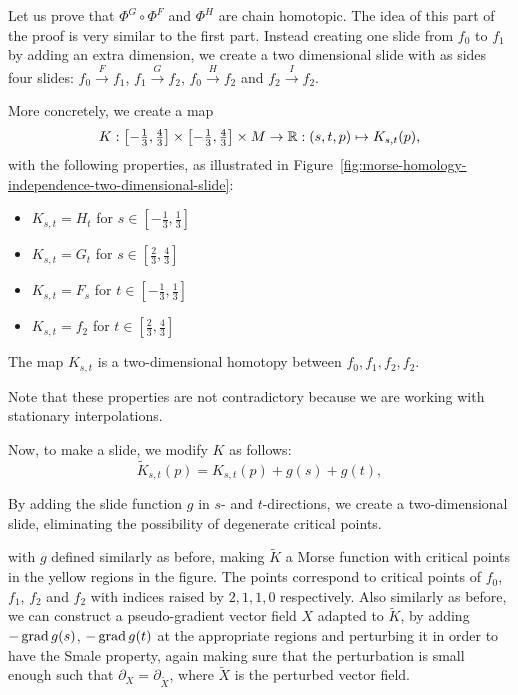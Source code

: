 \begin{myproof}
Let us prove that $\Phi^{G}  \circ  \Phi^{F}$ and $\Phi^{H}$ are chain homotopic.
The idea of this part of the proof is very similar to the first part.
Instead creating one slide from $f_0$ to $f_1$ by adding an extra dimension, we create a two dimensional slide with as sides four slides: $f_0 \xrightarrow{F} f_1$, $ f_1 \xrightarrow{G} f_2$, $f_0 \xrightarrow{H}  f_2$ and $ f_2 \xrightarrow{I} f_2$.


More concretely, we create a map
\[
    K: \left[-\tfrac{1}{3}, \tfrac{4}{3}\right] \times \left[-\tfrac{1}{3}, \tfrac{4}{3}\right] \times M \to  \mathbb{R}:  (s, t, p) \mapsto K_{s, t}(p)
,\] 
with the following properties, as illustrated in Figure~\ref{fig:morse-homology-independence-two-dimensional-slide}:
\begin{itemize}
    \item $K_{s,t} = H_t$ for  $s \in \left[-\tfrac{1}{3}, \tfrac{1}{3}\right]$
    \item $K_{s,t} = G_t$ for  $s \in \left[\tfrac{2}{3}, \tfrac{4}{3}\right]$
        \item $K_{s, t} = F_s$ for $t \in \left[-\tfrac{1}{3}, \tfrac{1}{3}\right]$ 
        \item $K_{s,t} = f_2$ for $t \in \left[\tfrac{2}{3}, \tfrac{4}{3}\right]$
\end{itemize}
\begin{marginfigure}
    \centering
    \caption{The map $K_{s,t}$ is a two-dimensional homotopy between $f_0, f_1, f_2, f_2$.}
    \label{fig:morse-homology-independence-two-dimensional-slide}
\end{marginfigure}
Note that these properties are not contradictory because we are working with stationary interpolations.

Now, to make a slide, we modify $K$ as follows:
 \[
     \tilde{K}_{s,t}(p) = K_{s,t}(p) + g(s) + g(t)
,\] 

\begin{marginfigure}
    \centering
    \caption{By adding the slide function $g$ in $s$- and $t$-directions, we create a two-dimensional slide, eliminating the possibility of degenerate critical points.}
    \label{fig:morse-homology-independence-two-dimensional-slide-three-d}
\end{marginfigure}

with $g$ defined similarly as before, making $\tilde{K}$ a Morse function with critical points in the yellow regions in the figure.
The points correspond to critical points of $f_0$, $f_1$, $f_2$ and $f_2$ with indices raised by $2, 1, 1, 0$ respectively.
Also similarly as before, we can construct a pseudo-gradient vector field $X$ adapted to $\tilde{K}$, by adding $-\operatorname{grad} g(s)$, $-\operatorname{grad} g(t)$ at the appropriate regions and perturbing it in order to have the Smale property, again making sure that the perturbation is small enough such that $\partial_X = \partial_{\tilde X}$, where $\tilde{X}$ is the perturbed vector field.


\end{myproof}
